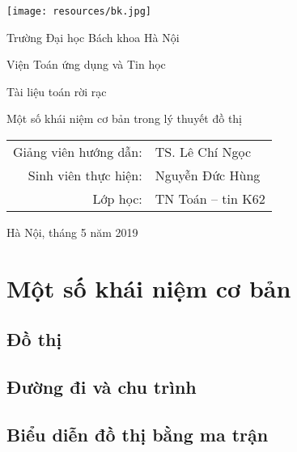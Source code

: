 

\usepackage[backend=bibtex]{biblatex}
\usepackage[utf8]{vietnam}
\usepackage[T1]{fontenc}
\usepackage{inconsolata}

\renewcommand{\bibname}{Danh mục tài liệu tham khảo}
\nocite{*}

\newcommand{\abs}[1]{\left\lvert#1\right\rvert}
\everymath{\displaystyle}
\renewcommand{\qedsymbol}{$\blacksquare$}


\pagestyle{plain}
\pagestyle{fancy}
\begin{titlepage}
	\begin{minipage}[c]{4em}
		\texttt{[image: resources/bk.jpg]}
	\end{minipage}
	\begin{minipage}[l]{\textwidth - 4em}
		{\Huge Trường Đại học Bách khoa Hà Nội\par}
		{\large Viện Toán ứng dụng và Tin học}
	\end{minipage}
	\vfill
	\vfill
	\begin{center}
		{\Large Tài liệu toán rời rạc}\par
		{\LARGE Một số khái niệm cơ bản trong lý thuyết đồ thị}\par
		\vfill
		{\large
			\begin{tabular}{rl}
				{ Giảng viên hướng dẫn}:&TS. Lê Chí Ngọc\\
				{ Sinh viên thực hiện:}& Nguyễn Đức Hùng\\
				{ Lớp học:} & TN Toán -- tin K62
			\end{tabular}
		}
		\vfill
		{\large Hà Nội, tháng 5 năm 2019}
	\end{center}
\end{titlepage}
\tableofcontents

\chapter{Một số khái niệm cơ bản}
\section{Đồ thị}


\section{Đường đi và chu trình}


\section{Biểu diễn đồ thị bằng ma trận}


